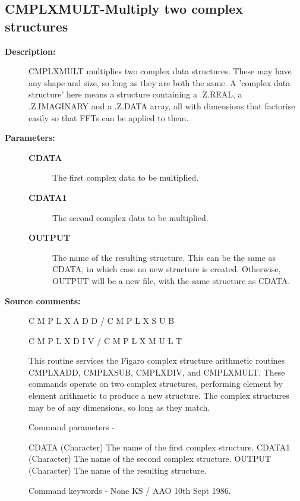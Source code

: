 \subsection{CMPLXMULT-\label{CMPLXMULT}Multiply two complex structures}
\begin{description}

\item [\textbf{Description:}]
 CMPLXMULT multiplies two complex data structures.  These  may
 have any shape and size, so long as they are both the same.  A
 'complex data structure' here means a structure containing a
 .Z.REAL, a .Z.IMAGINARY and a .Z.DATA array, all with dimensions
 that factorise easily so that FFTs can be applied to them.

\item [\textbf{Parameters:}]
\begin{description}
\item [\textbf{CDATA}]
 The first complex data to be multiplied.
\item [\textbf{CDATA1}]
 The second complex data to be multiplied.
\item [\textbf{OUTPUT}]
 The name of the resulting structure. This can
 be the same as CDATA, in which case no new structure is
 created.  Otherwise, OUTPUT will be a new file, with the
 same structure as CDATA.
\end{description}

\item [\textbf{Source comments:}]
\begin{terminalv}
 C M P L X A D D   /   C M P L X S U B

 C M P L X D I V   /   C M P L X M U L T

 This routine services the Figaro complex structure arithmetic
 routines CMPLXADD, CMPLXSUB, CMPLXDIV, and CMPLXMULT.  These
 commands operate on two complex structures, performing element
 by element arithmetic to produce a new structure.  The complex
 structures may be of any dimensions, so long as they match.

 Command parameters -

 CDATA    (Character) The name of the first complex structure.
 CDATA1   (Character) The name of the second complex structure.
 OUTPUT   (Character) The name of the resulting structure.

 Command keywords - None
                                     KS / AAO  10th Sept 1986.
\end{terminalv}
\end{description}
